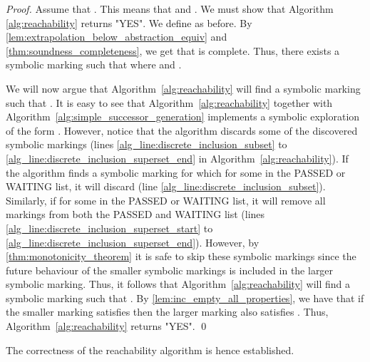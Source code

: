 \begin{proof}
Assume that . This means that 
 and . We must show that Algorithm \ref{alg:reachability} 
returns "YES".
We define  as before.
By \cref{lem:extrapolation_below_abstraction_equiv} and \cref{thm:soundness_completeness}, we get that  is complete. Thus, there exists a symbolic marking  such that  where  and .

We will now argue that Algorithm~\ref{alg:reachability} will find a symbolic marking   such that . It is easy to see that Algorithm~\ref{alg:reachability} together with Algorithm~\ref{alg:simple_successor_generation} implements a symbolic exploration of the form . 
However, notice that the algorithm discards some of the discovered symbolic markings (lines \ref{alg_line:discrete_inclusion_subset} to \ref{alg_line:discrete_inclusion_superset_end} in Algorithm~\ref{alg:reachability}). If the algorithm finds a symbolic marking  for which  for some  in the PASSED or WAITING list, it will discard  (line \ref{alg_line:discrete_inclusion_subset}). Similarly, if  for some  in the PASSED or WAITING list, it will remove all markings  from both the PASSED and WAITING list (lines \ref{alg_line:discrete_inclusion_superset_start} to \ref{alg_line:discrete_inclusion_superset_end}). However, by \cref{thm:monotonicity_theorem} it is safe to skip these symbolic markings since the future behaviour of the smaller symbolic markings is included in the larger symbolic marking. 
Thus, it follows that Algorithm~\ref{alg:reachability} will find a symbolic marking  such that . 
By \cref{lem:inc_empty_all_properties}, we have that if the smaller marking satisfies  then the larger marking  also satisfies .  
Thus, Algorithm~\ref{alg:reachability} returns "YES".
\qed
\end{proof}










The correctness of the reachability algorithm is hence established.
